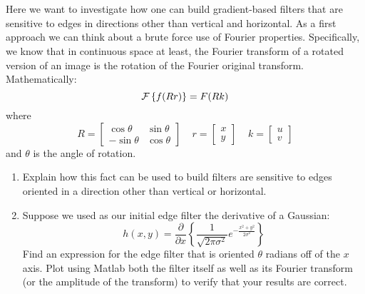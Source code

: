 \documentclass[11pt]{article}
\begin{document}
\section{}\label{ps04p04}
Here we want to investigate how one can build gradient-based filters that are sensitive to edges in directions other than vertical and horizontal. As a first approach we can think about a brute force use of Fourier properties.  Specifically, we know that in continuous space at least, the Fourier transform of a rotated version of an image is the rotation of the Fourier original transform.  Mathematically:
\begin{equation}
{\cal F}\left\{f(Rr) \right\} = F(Rk)
\end{equation}
where
\begin{equation}
R = \begin{bmatrix}
\cos\theta & \sin\theta \\ -\sin\theta & \cos\theta
\end{bmatrix} \;\;\;\;
r =
\begin{bmatrix}
x\\y
\end{bmatrix} \;\;\;\;
k =
\begin{bmatrix}
u\\v
\end{bmatrix}
\end{equation}
and $\theta$ is the angle of rotation.
\begin{enumerate}
	\item Explain how this fact can be used to build filters are sensitive to edges oriented in a direction other than vertical or horizontal.
	\item Suppose we used as our initial edge filter the derivative of a Gaussian:
	\begin{equation}
	h(x,y) = \frac{\partial}{\partial x} 
	\left\{ \frac{1}{\sqrt{2\pi\sigma^2}}
	e^{-\frac{x^2+y^2}{2\sigma^2}}\right\}
	\end{equation}
	Find an expression for the edge filter that is oriented $\theta$ radians off of the $x$ axis.  Plot using Matlab both the filter itself as well as its Fourier transform (or the amplitude of the transform) to verify that your results are correct.
\end{enumerate}

\end{document}
